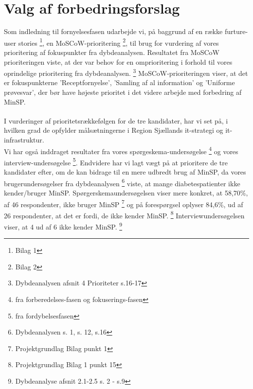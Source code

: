 %
%
%
%
%
%
%
%
%
%
%
%
%
%
%
%
%
%
%
%
%
%
%
%
%
%
%
%
%
\section{Valg af forbedringsforslag}
Som indledning til fornyelsesfasen udarbejde vi, på baggrund af en række furture-user stories \footnote{Bilag 1}, en MoSCoW-prioritering \footnote{Bilag 2}, til brug for vurdering af vores prioritering af fokuspunkter fra dybdeanalysen.
Resultatet fra MoSCoW prioriteringen viste, at der var behov for en omprioritering i forhold til vores oprindelige prioritering fra dybdeanalysen. \footnote{Dybdeanalysen afsnit 4 Prioriteter s.16-17}
%
MoSCoW-prioriteringen viser, at det er fokuspunkterne 'Receptfornyelse', 'Samling af al information' og 'Uniforme prøvesvar', der bør have højeste prioritet i det videre arbejde med forbedring af MinSP.\\
\\
I vurderinger af prioritetsrækkefølgen for de tre kandidater, har vi set på, i hvilken grad de opfylder målsætningerne i Region Sjællands it-strategi og it-infrastruktur. \\
Vi har også inddraget resultater fra vores spørgeskema-undersøgelse \footnote{fra forberedelses-fasen og fokuserings-fasen} og vores interview-undersøgelse \footnote{fra fordybelsesfasen}.
Endvidere har vi lagt vægt på at prioritere de tre kandidater efter, om de kan bidrage til en mere udbredt brug af MinSP, da vores brugerundersøgelser fra dybdeanalysen \footnote{Dybdeanalysen s. 1, s. 12, s.16} viste, at mange diabetespatienter ikke kender/bruger MinSP. 
Spørgerskemaundersøgelsen viser mere konkret, at 58,70\%, af 46 respondenter, ikke bruger MinSP \footnote{Projektgrundlag Bilag punkt 1} og på forespørgsel oplyser 84,6\%, ud af 26 respondenter, at det er fordi, de ikke kender MinSP. \footnote{Projektgrundlag Bilag 1 punkt 15} Interviewundersøgelsen viser, at 4 ud af 6 ikke kender MinSP. \footnote{Dybdeanalyse afsnit 2.1-2.5 s. 2 - s.9}\\
